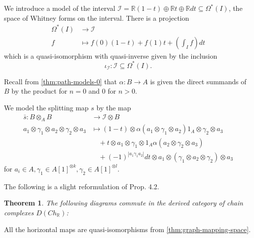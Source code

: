 \documentclass{scrartcl}
\theoremstyle{plain}
\newtheorem{theorem}{Theorem}[section]
\theoremstyle{definition}
\newcommand{\R}{\mathbb R}
\newcommand{\abs}[1]{\left\lvert#1\right\rvert}
\renewcommand{\subset}{\subseteq}
\DeclareMathOperator{\Map}{Map}
\begin{document}
We introduce a model of the interval $\mathcal I = \R (1-t) \oplus \R t \oplus \R dt\subset \Omega^*(I)$, the space of Whitney forms on the interval. There is a projection 
\begin{align*}
    \Omega^*(I) &\to \mathcal I\\
    f&\mapsto f(0)(1-t) + f(1) t + \left(\int_I f\right) dt
\end{align*}
which is a quasi-isomorphism with quasi-inverse given by the inclusion $$\iota_{\mathcal I}\colon \mathcal I \subset \Omega^*(I).$$ 

Recall from \cref{thm:path-models-0} that $\alpha\colon B\to A$ is given the direct summands of $B$ by the product for $n=0$ and $0$ for $n>0$.

We model the splitting map $s$ by the map 
\begin{align*}
    \bar s \colon B\otimes_A B&\to \mathcal I\otimes B \\
    a_1 \otimes \gamma_1 \otimes a_2 \otimes \gamma_2 \otimes a_3 &\mapsto  (1-t) \otimes \alpha (a_1 \otimes \gamma_1 \otimes a_2)1_A \otimes \gamma_2 \otimes a_3 \\
    &\quad+ t\otimes a_1 \otimes \gamma_1 \otimes 1_A \alpha (a_2 \otimes \gamma_2 \otimes a_3)  \\
    &\quad +  (-1) ^{\abs{a_1\gamma_1a_2}} dt\otimes a_1 \otimes (\gamma_1\otimes a_2\otimes \gamma_2) \otimes a_3
\end{align*}
for $a_i\in A, \gamma_1\in A[1]^{\otimes k}, \gamma_2\in A[1]^{\otimes l}$.

The following is a slight reformulation of \cite{naef2019string}{Prop. 4.2}.
\begin{theorem}\label{thm:model-splitting}
    The following diagrams commute in the derived category of chain complexes $D(Ch_\R)$:

    \qquad
\end{theorem}
All the horizontal maps are quasi-isomorphisms from \cref{thm:graph-mapping-space}.
\end{document}
